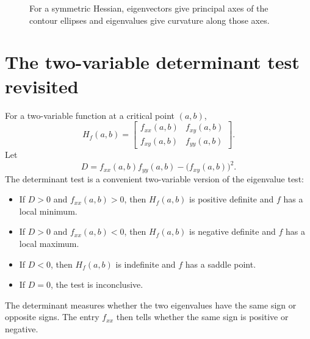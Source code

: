 \documentclass[11pt]{article}
\begin{document}
\begin{figure}[H]
\centering
{}
\caption{For a symmetric Hessian, eigenvectors give principal axes of the contour ellipses and eigenvalues give curvature along those axes.}
\end{figure}

\section{The two-variable determinant test revisited}

For a two-variable function at a critical point $(a,b)$,
\[
H_f(a,b)=\begin{bmatrix}f_{xx}(a,b)&f_{xy}(a,b)\\f_{xy}(a,b)&f_{yy}(a,b)\end{bmatrix}.
\]
Let
\[
D=f_{xx}(a,b)f_{yy}(a,b)-\bigl(f_{xy}(a,b)\bigr)^2.
\]
The determinant test is a convenient two-variable version of the eigenvalue test:
\begin{itemize}
  \item If $D>0$ and $f_{xx}(a,b)>0$, then $H_f(a,b)$ is positive definite and $f$ has a local minimum.
  \item If $D>0$ and $f_{xx}(a,b)<0$, then $H_f(a,b)$ is negative definite and $f$ has a local maximum.
  \item If $D<0$, then $H_f(a,b)$ is indefinite and $f$ has a saddle point.
  \item If $D=0$, the test is inconclusive.
\end{itemize}
The determinant measures whether the two eigenvalues have the same sign or opposite signs. The entry $f_{xx}$ then tells whether the same sign is positive or negative.
\end{document}
